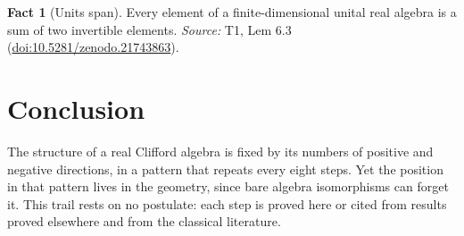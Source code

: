 \documentclass[11pt]{article}
\theoremstyle{definition}
\newtheorem{fact}[theorem]{Fact}
\theoremstyle{plain}
\begin{document}
\begin{fact}[Units span]\label{c:transport.units-span}
Every element of a finite-dimensional unital real algebra is a sum of two invertible elements.
\emph{Source:} T1, Lem 6.3 (\href{https://doi.org/10.5281/zenodo.21743863}{doi:10.5281/zenodo.21743863}).
\end{fact}

\section*{Conclusion}
The structure of a real Clifford algebra is fixed by its numbers of positive and negative directions, in a pattern that repeats every eight steps. Yet the position in that pattern lives in the geometry, since bare algebra isomorphisms can forget it. This trail rests on no postulate: each step is proved here or cited from results proved elsewhere and from the classical literature.
\end{document}
